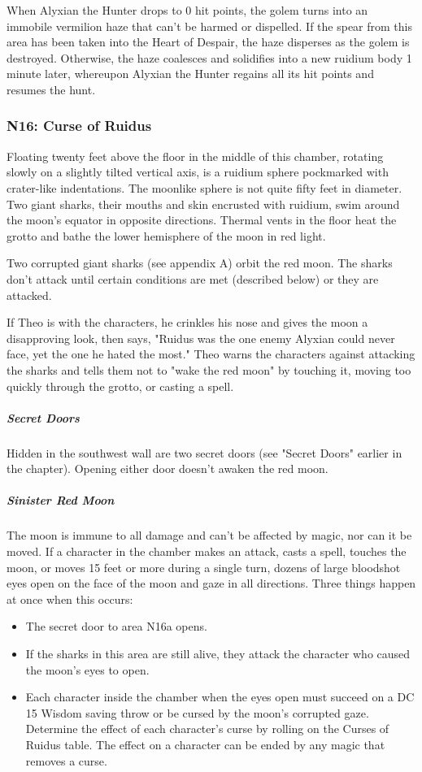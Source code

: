 \documentclass[10pt,a4paper,twoside,fancy,bg=print,twocolumn,openany,nodeprecatedcode]{dndbook}
\begin{document}
When Alyxian the Hunter drops to 0 hit points, the golem turns into an immobile vermilion haze that can't be harmed or dispelled. If the spear from this area has been taken into the Heart of Despair, the haze disperses as the golem is destroyed. Otherwise, the haze coalesces and solidifies into a new ruidium body 1 minute later, whereupon Alyxian the Hunter regains all its hit points and resumes the hunt.

\subsubsection{N16: Curse of Ruidus}
\begin{DndReadAloud}{}
Floating twenty feet above the floor in the middle of this chamber, rotating slowly on a slightly tilted vertical axis, is a ruidium sphere pockmarked with crater-like indentations. The moonlike sphere is not quite fifty feet in diameter. Two giant sharks, their mouths and skin encrusted with ruidium, swim around the moon's equator in opposite directions. Thermal vents in the floor heat the grotto and bathe the lower hemisphere of the moon in red light.

\end{DndReadAloud}

Two corrupted giant sharks (see appendix A) orbit the red moon. The sharks don't attack until certain conditions are met (described below) or they are attacked.

If Theo is with the characters, he crinkles his nose and gives the moon a disapproving look, then says, "Ruidus was the one enemy Alyxian could never face, yet the one he hated the most." Theo warns the characters against attacking the sharks and tells them not to "wake the red moon" by touching it, moving too quickly through the grotto, or casting a spell.

\subparagraph{Secret Doors}
Hidden in the southwest wall are two secret doors (see "Secret Doors" earlier in the chapter). Opening either door doesn't awaken the red moon.

\subparagraph{Sinister Red Moon}
The moon is immune to all damage and can't be affected by magic, nor can it be moved. If a character in the chamber makes an attack, casts a spell, touches the moon, or moves 15 feet or more during a single turn, dozens of large bloodshot eyes open on the face of the moon and gaze in all directions. Three things happen at once when this occurs:


\begin{itemize}
\item The secret door to area N16a opens.
\item If the sharks in this area are still alive, they attack the character who caused the moon's eyes to open.
\item Each character inside the chamber when the eyes open must succeed on a DC 15 Wisdom saving throw or be cursed by the moon's corrupted gaze. Determine the effect of each character's curse by rolling on the Curses of Ruidus table. The effect on a character can be ended by any magic that removes a curse.
\end{itemize}
\end{document}
